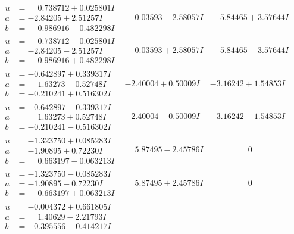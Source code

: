 \documentclass[1p]{elsarticle_modified}
\theoremstyle{definition}
\begin{document}
$$\begin{array}{c|c|c}
\begin{aligned}
u &= \phantom{-}0.738712 + 0.025801 I \\
a &= -2.84205 + 2.51257 I \\
b &= \phantom{-}0.986916 - 0.482298 I\end{aligned}
 & \phantom{-}0.03593 - 2.58057 I & \phantom{-}5.84465 + 3.57644 I \\ \hline\begin{aligned}
u &= \phantom{-}0.738712 - 0.025801 I \\
a &= -2.84205 - 2.51257 I \\
b &= \phantom{-}0.986916 + 0.482298 I\end{aligned}
 & \phantom{-}0.03593 + 2.58057 I & \phantom{-}5.84465 - 3.57644 I \\ \hline\begin{aligned}
u &= -0.642897 + 0.339317 I \\
a &= \phantom{-}1.63273 - 0.52748 I \\
b &= -0.210241 + 0.516302 I\end{aligned}
 & -2.40004 + 0.50009 I & -3.16242 + 1.54853 I \\ \hline\begin{aligned}
u &= -0.642897 - 0.339317 I \\
a &= \phantom{-}1.63273 + 0.52748 I \\
b &= -0.210241 - 0.516302 I\end{aligned}
 & -2.40004 - 0.50009 I & -3.16242 - 1.54853 I \\ \hline\begin{aligned}
u &= -1.323750 + 0.085283 I \\
a &= -1.90895 + 0.72230 I \\
b &= \phantom{-}0.663197 - 0.063213 I\end{aligned}
 & \phantom{-}5.87495 - 2.45786 I & \phantom{-0.000000 } 0 \\ \hline\begin{aligned}
u &= -1.323750 - 0.085283 I \\
a &= -1.90895 - 0.72230 I \\
b &= \phantom{-}0.663197 + 0.063213 I\end{aligned}
 & \phantom{-}5.87495 + 2.45786 I & \phantom{-0.000000 } 0 \\ \hline\begin{aligned}
u &= -0.004372 + 0.661805 I \\
a &= \phantom{-}1.40629 - 2.21793 I \\
b &= -0.395556 - 0.414217 I\end{aligned}

\end{array}$$
\end{document}
